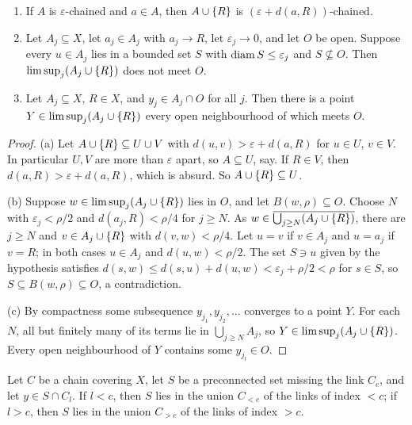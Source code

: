\begin{lemma}\label{lem:limit-tools}
\begin{enumerate}[label=(\alph*)]
\item If $A$ is $\varepsilon$-chained and $a\in A$, then $A\cup\left\{ R \right\}$ is $(\varepsilon+d(a,R))$-chained.
\item Let $A_j\subseteq X$, let $a_j\in A_j$ with $a_j\to R$, let $\varepsilon_j\to0$, and let $O$ be open. Suppose every $u\in A_j$ lies in a
bounded set $S$ with $\operatorname{diam} S\le\varepsilon_j$ and $S\not\subseteq O$. Then $\limsup_j(A_j\cup\left\{ R \right\})$ does not meet $O$.
\item Let $A_j\subseteq X$, $R\in X$, and $y_j\in A_j\cap O$ for all $j$. Then there is a point $Y\in\limsup_j(A_j\cup\left\{ R \right\})$ every open
neighbourhood of which meets $O$.
\end{enumerate}
\end{lemma}

\begin{proof}
(a) Let $A\cup\left\{ R \right\}\subseteq U\cup V$ with $d(u,v)>\varepsilon+d(a,R)$ for $u\in U$, $v\in V$. In particular $U,V$ are more than
$\varepsilon$ apart, so $A\subseteq U$, say. If $R\in V$, then $d(a,R)>\varepsilon+d(a,R)$, which is absurd. So $A\cup\left\{ R \right\}\subseteq U$.

(b) Suppose $w\in\limsup_j(A_j\cup\left\{ R \right\})$ lies in $O$, and let $B(w,\rho)\subseteq O$. Choose $N$ with $\varepsilon_j<\rho/2$ and
$d(a_j,R)<\rho/4$ for $j\ge N$. As $w\in\overline{\bigcup_{j\ge N}(A_j\cup\left\{ R \right\})}$, there are $j\ge N$ and $v\in A_j\cup\left\{ R \right\}$ with
$d(v,w)<\rho/4$. Let $u=v$ if $v\in A_j$ and $u=a_j$ if $v=R$; in both cases $u\in A_j$ and $d(u,w)<\rho/2$. The set $S\ni u$ given by
the hypothesis satisfies $d(s,w)\le d(s,u)+d(u,w)<\varepsilon_j+\rho/2<\rho$ for $s\in S$, so $S\subseteq B(w,\rho)\subseteq O$, a
contradiction.

(c) By compactness some subsequence $y_{j_1},y_{j_2},\dots$ converges to a point $Y$. For each $N$, all but finitely many of its terms lie in
$\bigcup_{j\ge N}A_j$, so $Y\in\limsup_j(A_j\cup\left\{ R \right\})$. Every open neighbourhood of $Y$ contains some $y_{j_l}\in O$.
\end{proof}


\begin{lemma}\label{lem:side}
Let $C$ be a chain covering $X$, let $S$ be a preconnected set missing the link $C_c$, and let $y\in S\cap C_l$. If $l<c$, then $S$ lies
in the union $C_{<c}$ of the links of index $<c$; if $l>c$, then $S$ lies in the union $C_{>c}$ of the links of index $>c$.
\end{lemma}

